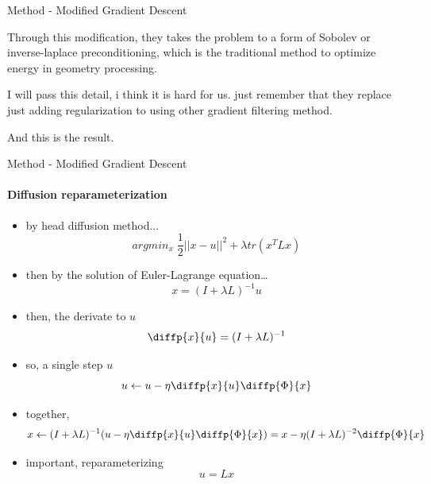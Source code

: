 \documentclass[beamer]{standalone}
\begin{document}
\begin{frame}{Method - Modified Gradient Descent}
{            Through this modification, they takes the problem to a form of Sobolev or inverse-laplace preconditioning, which is the traditional method to optimize energy in geometry processing.
            
            I will pass this detail, i think it is hard for us. 
            just remember that they replace just adding regularization to using other gradient filtering method.

            And this is the result.
        }
    \end{frame}

\begin{frame}{Method - Modified Gradient Descent}
\framesubtitle{Diffusion reparameterization}

\begin{itemize}
\begingroup
\small
\item by head diffusion method...
\begin{equation}
    argmin_{x} \; \frac{1}{2} {||x-u||}^{2} + \lambda tr (x^{T}Lx)
\end{equation}

\item then by the solution of Euler-Lagrange equation\dots
\begin{equation}
    x = (I + \lambda L)^{-1} u
\end{equation}

\item then, the derivate to $u$
\begin{equation}
    \diffp{x}{u} = (I + \lambda L)^{-1}
\end{equation}

\item so, a single step $u$
\begin{equation}
    u \leftarrow u - \eta \diffp{x}{u} \diffp{\Phi}{x}
\end{equation}

\item together,
\begin{equation}
    x \leftarrow (I + \lambda L)^{-1} (u- \eta \diffp{x}{u} \diffp{\Phi}{x}) 
    = x - \eta(I + \lambda L)^{-2} \diffp{\Phi}{x}
\end{equation}
\endgroup

\item important, reparameterizing
\begin{equation}
    u = Lx
\end{equation}
\end{itemize}
\end{frame}
\end{document}
